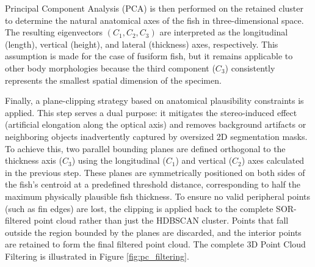 \documentclass[utf8]{FrontiersinHarvard} %
\begin{document}
Principal Component Analysis (PCA) is then performed on the retained cluster to determine the natural anatomical axes of the fish in three-dimensional space. The resulting eigenvectors $(C_1, C_2, C_3)$ are interpreted as the longitudinal (length), vertical (height), and lateral (thickness) axes, respectively. This assumption is made for the case of fusiform fish, but it remains applicable to other body morphologies because the third component ($C_3$) consistently represents the smallest spatial dimension of the specimen. 

Finally, a plane-clipping strategy based on anatomical plausibility constraints is applied. This step serves a dual purpose: it mitigates the stereo-induced effect (artificial elongation along the optical axis) and removes background artifacts or neighboring objects inadvertently captured by oversized 2D segmentation masks.
To achieve this, two parallel bounding planes are defined orthogonal to the thickness axis ($C_3$) using the longitudinal ($C_1$) and vertical ($C_2$) axes calculated in the previous step. These planes are symmetrically positioned on both sides of the fish's centroid at a predefined threshold distance, corresponding to half the maximum physically plausible fish thickness. To ensure no valid peripheral points (such as fin edges) are lost, the clipping is applied back to the complete SOR-filtered point cloud rather than just the HDBSCAN cluster. Points that fall outside the region bounded by the planes are discarded, and the interior points are retained to form the final filtered point cloud. The complete 3D Point Cloud Filtering is illustrated in Figure \ref{fig:pc_filtering}.
\end{document}
